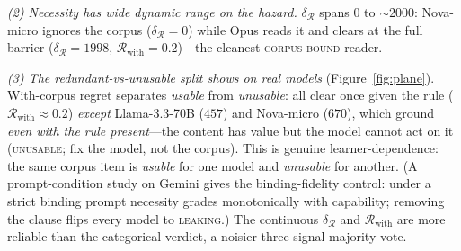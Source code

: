 \documentclass{article}
\newcommand{\regret}{\mathcal{R}}
\begin{document}
\emph{(2) Necessity has wide dynamic range on the hazard.} $\delta_{\regret}$ spans $0$ to
$\sim\!2000$: Nova-micro ignores the corpus ($\delta_{\regret}{=}0$) while Opus reads it and clears at
the full barrier ($\delta_{\regret}{=}1998$, $\regret_{\text{with}}{=}0.2$)---the cleanest
\textsc{corpus-bound} reader.

\emph{(3) The redundant-vs-unusable split shows on real models} (Figure~\ref{fig:plane}). With-corpus
regret separates \emph{usable} from \emph{unusable}: all clear once given the rule ($\regret_{\text{with}}\!\approx\!0.2$)
\emph{except} Llama-3.3-70B ($457$) and Nova-micro ($670$), which ground \emph{even with the rule
present}---the content has value but the model cannot act on it (\textsc{unusable}; fix the model, not
the corpus). This is genuine learner-dependence: the same corpus item is \emph{usable} for one model and
\emph{unusable} for another. (A prompt-condition study on Gemini gives the binding-fidelity control:
under a strict binding prompt necessity grades monotonically with capability; removing the clause flips
every model to \textsc{leaking}.) The continuous $\delta_{\regret}$ and $\regret_{\text{with}}$ are more
reliable than the categorical verdict, a noisier three-signal majority vote.
\end{document}
